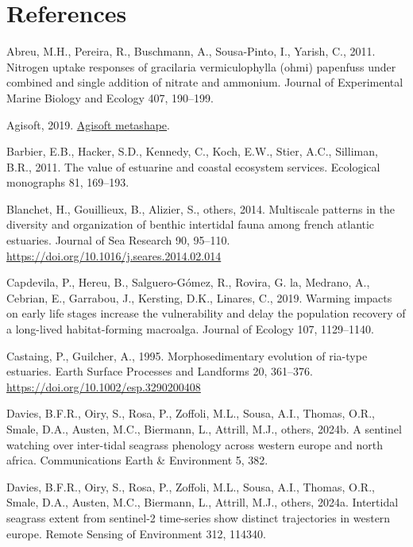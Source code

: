\documentclass[
  letterpaper,
  DIV=11,
  numbers=noendperiod]{scrartcl}
\newlength{\cslhangindent}
\newenvironment{CSLReferences}[2] %
 {\begin{list}{}{%
  \setlength{\itemindent}{0pt}
  \setlength{\leftmargin}{0pt}
  \setlength{\parsep}{0pt}
  \ifodd #1
   \setlength{\leftmargin}{\cslhangindent}
   \setlength{\itemindent}{-1\cslhangindent}
  \fi
  \setlength{\itemsep}{#2\baselineskip}}}
 {\end{list}}
\begin{document}
\section*{References}\label{references}

\label{refs}
\begin{CSLReferences}{1}{0}
Abreu, M.H., Pereira, R., Buschmann, A., Sousa-Pinto, I., Yarish, C.,
2011. Nitrogen uptake responses of gracilaria vermiculophylla (ohmi)
papenfuss under combined and single addition of nitrate and ammonium.
Journal of Experimental Marine Biology and Ecology 407, 190--199.

Agisoft, 2019. \href{https://www.agisoft.com/}{Agisoft metashape}.

Barbier, E.B., Hacker, S.D., Kennedy, C., Koch, E.W., Stier, A.C.,
Silliman, B.R., 2011. The value of estuarine and coastal ecosystem
services. Ecological monographs 81, 169--193.

Blanchet, H., Gouillieux, B., Alizier, S., others, 2014. Multiscale
patterns in the diversity and organization of benthic intertidal fauna
among french atlantic estuaries. Journal of Sea Research 90, 95--110.
\url{https://doi.org/10.1016/j.seares.2014.02.014}

Capdevila, P., Hereu, B., Salguero-Gómez, R., Rovira, G. la, Medrano,
A., Cebrian, E., Garrabou, J., Kersting, D.K., Linares, C., 2019.
Warming impacts on early life stages increase the vulnerability and
delay the population recovery of a long-lived habitat-forming macroalga.
Journal of Ecology 107, 1129--1140.

Castaing, P., Guilcher, A., 1995. Morphosedimentary evolution of
ria-type estuaries. Earth Surface Processes and Landforms 20, 361--376.
\url{https://doi.org/10.1002/esp.3290200408}

Davies, B.F.R., Oiry, S., Rosa, P., Zoffoli, M.L., Sousa, A.I., Thomas,
O.R., Smale, D.A., Austen, M.C., Biermann, L., Attrill, M.J., others,
2024b. A sentinel watching over inter-tidal seagrass phenology across
western europe and north africa. Communications Earth \& Environment 5,
382.

Davies, B.F.R., Oiry, S., Rosa, P., Zoffoli, M.L., Sousa, A.I., Thomas,
O.R., Smale, D.A., Austen, M.C., Biermann, L., Attrill, M.J., others,
2024a. Intertidal seagrass extent from sentinel-2 time-series show
distinct trajectories in western europe. Remote Sensing of Environment
312, 114340.


\end{CSLReferences}
\end{document}
